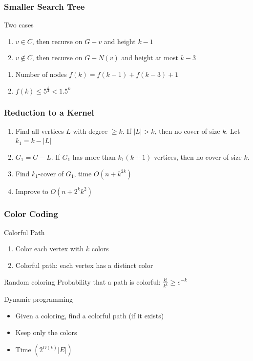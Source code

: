 \documentclass[12pt,aspectratio=169]{beamer}
\begin{document}
\begin{frame}\frametitle{Smaller Search Tree }
    \begin{block}{Two cases}
      \begin{enumerate}
      \item
        $v\in C$, then recurse on $G-v$ and height $k-1$
      \item
        $v\notin C$, then recurse on $G-N(v)$ and height at most $k-3$
      \end{enumerate}
    \end{block}

      \begin{enumerate}
      \item
    Number of nodes $f(k) = f(k-1) + f(k-3) +1$
  \item
    $f(k) \le 5^{\frac{k}{4}}< 1.5^{k}$
  \end{enumerate}
\end{frame}



\begin{frame}\frametitle{Reduction to a Kernel}
  \begin{enumerate}
  \item
    Find all vertices $L$ with degree $\ge k$.
%
    If $|L|>k$, then no cover of size $k$.
%
    Let $k_{1} = k - |L|$
  \item
    $G_{1} = G - L$.
%
    If $G_{1}$ has more than $k_{1}(k+1)$ vertices, then no cover of size $k$.
  \item
    Find  $k_{1}$-cover of $G_{1}$, time $O(n + k^{2k})$
  \item
    Improve to $O(n + 2^{k}k^{2})$
  \end{enumerate}
\end{frame}


\begin{frame}\frametitle{Color Coding }
  \begin{block}{Colorful Path}
    \begin{enumerate}
    \item
      Color each vertex with $k$ colors
    \item
      Colorful path: each vertex has a distinct color
    \end{enumerate}
  \end{block}

  \begin{block}{Random coloring}
    Probability that a path is colorful: $\frac{k!}{k^{k}} \ge e^{-k}$
  \end{block}

  \begin{block}{Dynamic programming}
    \begin{itemize}
      \item
        Given a coloring, find a colorful path (if it exists)
      \item
        Keep only the colors
      \item
        Time $(2^{O(k)}|E|)$
      \end{itemize}
    \end{block}
\end{frame} 
\end{document}
